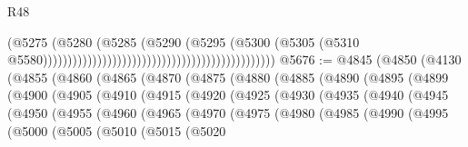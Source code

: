 \begin{lexlean}{R48}
\begin{coremodule}
                                                                                  (@5275
                                                                                    (@5280
                                                                                      (@5285
                                                                                        (@5290
                                                                                          (@5295
                                                                                            (@5300
                                                                                              (@5305
                                                                                                (@5310
                                                                                                  @5580)))))))))))))))))))))))))))))))))))))))))))))))
@5676 := @4845
    (@4850
      (@4130
        (@4855
          (@4860
            (@4865
              (@4870
                (@4875
                  (@4880
                    (@4885
                      (@4890
                        (@4895
                          (@4899
                            (@4900
                              (@4905
                                (@4910
                                  (@4915
                                    (@4920
                                      (@4925
                                        (@4930
                                          (@4935
                                            (@4940
                                              (@4945
                                                (@4950
                                                  (@4955
                                                    (@4960
                                                      (@4965
                                                        (@4970
                                                          (@4975
                                                            (@4980
                                                              (@4985
                                                                (@4990
                                                                  (@4995
                                                                    (@5000
                                                                      (@5005
                                                                        (@5010
                                                                          (@5015
                                                                            (@5020

\end{coremodule}
\end{lexlean}
